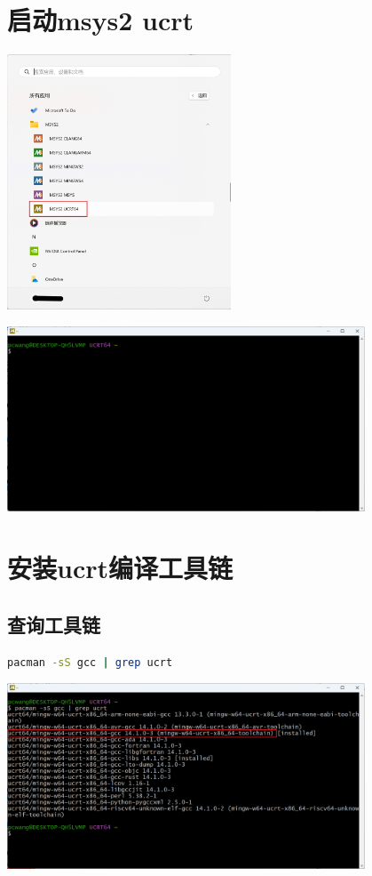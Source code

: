 \section{启动msys2 ucrt}
\begin{center}
	\includegraphics[width=0.5\textwidth]{03install/msys2_start.png}
\end{center}

\begin{center}
	\includegraphics[width=0.8\textwidth]{03install/msys2_ucrt.png}
\end{center}

\section{安装ucrt编译工具链}

\subsection{查询工具链}

\begin{lstlisting}[language=bash]
	pacman -sS gcc | grep ucrt
\end{lstlisting}

\begin{center}
	\includegraphics[width=0.8\textwidth]{03install/pacman_search_ucrt_gcc.png}
\end{center}

